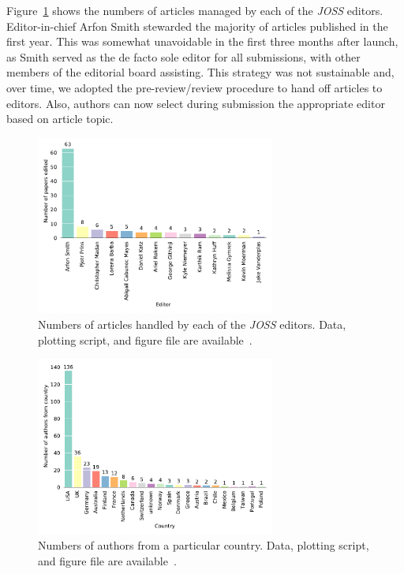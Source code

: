 \documentclass{article}
\newcommand\joss{\textit{JOSS}}
\begin{document}
Figure~\ref{fig:editors} shows the numbers of articles managed by each of the
\joss{} editors.
Editor-in-chief Arfon Smith stewarded
the majority of articles published in the
first year. This was somewhat unavoidable
in the first three months after launch, as
Smith served as the de facto sole editor for all submissions, with other members of the editorial
board assisting.
This strategy was not sustainable and, over time, we adopted the pre-review\slash review procedure to hand off articles to editors.
Also, authors can now select during submission the appropriate editor based on article topic.

\begin{figure}[htbp]
    \centering
    \includegraphics[width=0.7\textwidth]{JOSS-editor-counts.pdf}
    \caption{Numbers of articles handled by each of the \joss{}
    editors. Data, plotting script, and figure file are available~\cite{JOSS-data-figs}.
    }
    \label{fig:editors}
\end{figure}

\begin{figure}[htbp]
    \centering
    \includegraphics[width=0.7\textwidth]{author-affiliations.pdf}
    \caption{Numbers of authors from a particular country. 
    Data, plotting script, and figure file are available~\cite{JOSS-data-figs}.
    }
    \label{fig:affiliations}
\end{figure}
\end{document}
